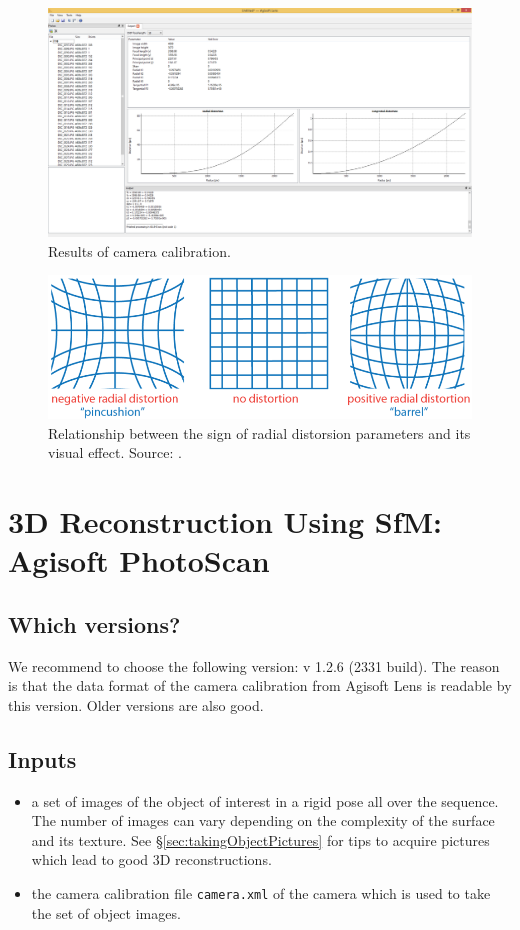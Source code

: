 \documentclass[11pt]{article}
\begin{document}
 \begin{figure}[h]
 	\begin{center}
 		\includegraphics[width=17 cm]{images/resultsLens.png}
 	\end{center}
 	\caption{Results of camera calibration.}
 	\label{fig:calibResults}
 \end{figure}
 
  \begin{figure}[h]
 	\begin{center}
 		\includegraphics[width=10 cm]{images/cameracalibrator_radial.png}
 	\end{center}
 	\caption{Relationship between the sign of radial distorsion parameters and its visual effect. Source: \cite{radialDistortion}.}
 	\label{fig:radialDistortion}
 \end{figure}


\section{3D Reconstruction Using SfM: Agisoft PhotoScan}
\subsection{Which versions?}
We recommend to choose the following version: v 1.2.6 (2331 build).
The reason is that the data format of the camera calibration from Agisoft Lens is readable by this version.
Older versions are also good.
\subsection{Inputs}
\begin{itemize}
\item a set of images of the object of interest in a rigid pose all over the sequence. The number of images can vary depending on the complexity of the surface and its texture. See \S\ref{sec:takingObjectPictures} for tips to acquire pictures which lead to good 3D reconstructions.
\item the camera calibration file {\tt camera.xml} of the camera which is used to take the set of object images.
\end{itemize}
\end{document}

